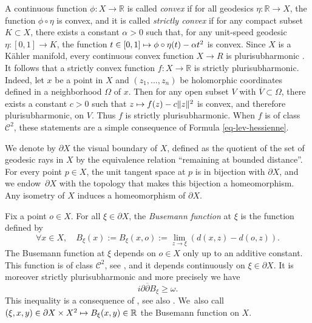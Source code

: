 \documentclass[JEP,XML,SOM,Unicode,NoEqCountersInSection,published]{cedram}
\newcommand\mto{\mathchoice{\longmapsto}{\mapsto}{\mapsto}{\mapsto}}
\theoremstyle{definition}
\newcommand{\R}{\mathbb{R}}
\begin{document}
A continuous function $\phi:X\to \R$ is called \textit{convex} if for all geodesics $\eta:\R\to X$, the function $\phi\circ\eta$ is convex, and it is called \textit{strictly convex} if for any compact subset \hbox{$K\!\subset\! X$}, there exists a constant $\alpha>0$ such that, for any unit-speed geodesic \hbox{$\eta:[0,1]\to K$}, the function $t\in [0,1]\mto \phi\circ\eta(t)-\alpha t^{2}$ is convex. Since $X$ is a Kähler manifold, every continuous convex function $X\to R$ is plurisubharmonic \cite[Th.\,3]{greeneSubharmonicityPlurisubharmonicityGeodesically1973}. It follows that a strictly convex function $f:X\to \R$ is strictly plurisubharmonic. Indeed, let $x$ be a point in $X$ and $(z_1,\dots,z_n)$ be holomorphic coordinates defined in a neighborhood $\Omega$ of $x$. Then for any open subset $V$ with $\overline{V}\subset \Omega$, there exists a constant $c>0$ such that $z\mto f(z)-c\lVert z\rVert^{2}$ is convex, and therefore plurisubharmonic, on $V$. Thus $f$ is strictly plurisubharmonic. When $f$ is of class $\mathcal{C}^2$, these statements are a simple consequence of Formula \eqref{eq-lev-hessienne}.

We denote by $\partial X$ the visual boundary of $X$, defined as the quotient of the set of geodesic rays in $X$ by the equivalence relation ``remaining at bounded distance''. For every point $p\in X$, the unit tangent space at $p$ is in bijection with $\partial X$, and we endow~$\partial X$ with the topology that makes this bijection a homeomorphism. Any isometry of $X$ induces a homeomorphism of $\partial X$.

Fix a point $o\in X$. For all $\xi \in \partial X$, the \textit{Busemann function} at $\xi$ is the function defined by
\begin{equation*}
\forall x\in X,\quad B_{\xi}(x):= B_{\xi}(x,o):= \lim_{z\to \xi}(d(x,z)-d(o,z)).
\end{equation*}
The Busemann function at $\xi$ depends on $o\in X$ only up to an additive constant. This function is of class $\mathcal{C}^{2}$, see \cite[Prop.\,3.1]{heintzeGeometryHorospheres1977}, and it depends continuously on $\xi \in \partial X$. It is moreover strictly plurisubharmonic and more precisely we have\begin{equation}\label{eq-Busemann-spsh}
i\partial\overline{\partial}B_{\xi} \ge \omega.
\end{equation}
This inequality is a consequence of \cite[Prop.\,2.28]{greeneFunctionTheoryManifolds1979}, see also \cite{siuCompactificationNegativelyCurved1982,chenDiscreteGroupsHolomorphic2013}. We~also call $(\xi,x,y)\in \partial X\times X^{2} \mto B_{\xi}(x,y) \in\R$ the Busemann function on $X$.
\end{document}
